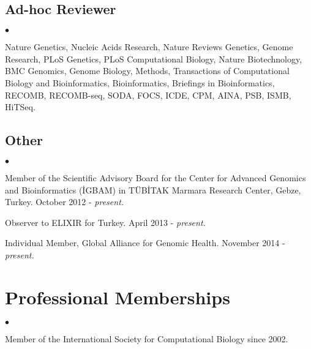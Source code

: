 \documentclass[margin,line]{res}
\newenvironment{list2}{
  \begin{list}{$\bullet$}{%
      \setlength{\itemsep}{0in}
      \setlength{\parsep}{0in} \setlength{\parskip}{0in}
      \setlength{\topsep}{0in} \setlength{\partopsep}{0in} 
      \setlength{\leftmargin}{0.2in}}}{\end{list}}
\begin{document}
\begin{resume}
\vspace{-0.5cm}
\subsection{\small \sc Ad-hoc Reviewer}
\begin{list2}
\item
  Nature Genetics, Nucleic Acids Research, Nature Reviews Genetics, Genome Research, PLoS Genetics, PLoS Computational Biology, 
  Nature Biotechnology, BMC Genomics, Genome Biology, Methods, Transactions of Computational Biology and Bioinformatics,
  Bioinformatics, Briefings in Bioinformatics, RECOMB, RECOMB-seq, SODA, FOCS, ICDE, CPM, AINA, PSB, ISMB, HiTSeq.
\end{list2}

\vspace{-0.5cm}
\subsection{\small \sc Other}
\begin{list2}
\item
  Member of the Scientific Advisory Board for the Center for Advanced Genomics and Bioinformatics (\.{I}GBAM)
  in T\"{U}B\.{I}TAK Marmara Research Center, Gebze, Turkey. October 2012 - {\it present.}
\item
  Observer to ELIXIR for Turkey. April 2013 - {\it present.}
\item
  Individual Member, Global Alliance for Genomic Health. November 2014 - {\it present.}
\end{list2}

\vspace*{-.2cm}
\section{\sc Professional Memberships}
\begin{list2}
\item 
  Member of the International Society for Computational Biology since 2002.
\end{list2}

\end{resume}
\end{document}
